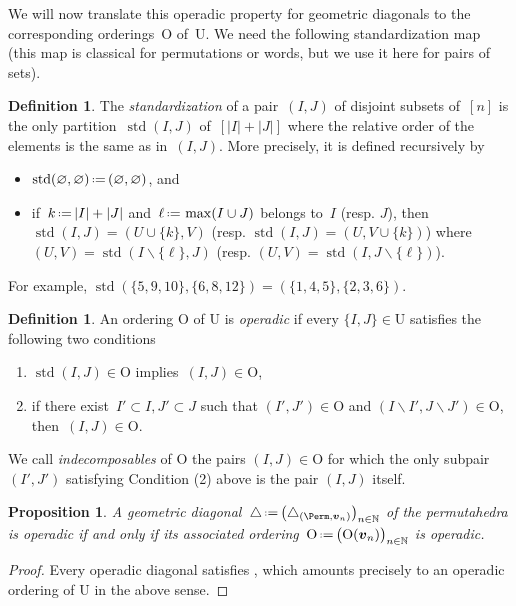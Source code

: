 \documentclass{amsart}
\newcommand{\darkblue}{\color{darkblue}} %
\newtheorem{proposition}[theorem]{Proposition}
\theoremstyle{definition}
\newtheorem{definition}[theorem]{Definition}
\newcommand{\N}{\mathbb{N}} %
\renewcommand{\b}[1]{{\boldsymbol{#1}}} %
\newcommand{\Un}{\mathrm{U}} %
\newcommand{\Or}{\mathrm{O}} %
\newcommand{\ssm}{\smallsetminus} %
\newcommand{\eqdef}{\mbox{\,\raisebox{0.2ex}{\scriptsize\ensuremath{\mathrm:}}\ensuremath{=}\,}} %
\DeclareMathOperator{\std}{std}
\newcommand{\defn}[1]{\textsl{\darkblue #1}} %
\renewcommand{\b}[1]{\boldsymbol{#1}} %
\begin{document}
We will now translate this operadic property for geometric diagonals to the corresponding orderings~$\Or$ of~$\Un$.
We need the following standardization map (this map is classical for permutations or words, but we use it here for pairs of sets).

\begin{definition}
The \defn{standardization} of a pair~$(I,J)$ of disjoint subsets of~$[n]$ is the only partition~$\std(I,J)$ of~$[|I|+|J|]$ where the relative order of the elements is the same as in~$(I,J)$.
More precisely, it is defined recursively by
\begin{itemize}
\item $\std(\varnothing, \varnothing) \eqdef (\varnothing, \varnothing)$, and
\item if~$k \eqdef |I|+|J|$ and~$\ell \eqdef \max(I \cup J)$ belongs to~$I$ (resp. $J$), then~$\std(I,J) = (U \cup \{k\}, V)$ (resp. $\std(I,J) \! = \! (U, V \cup \{k\})$) where~$(U,V) \! = \! \std(I \ssm \{\ell\}, J)$ (resp. ${(U,V) \! = \! \std(I, J \ssm \{\ell\})}$).
\end{itemize}
\end{definition}

For example, $\std(\{5,9,10\},\{6,8,12\}) = (\{1,4,5\},\{2,3,6\})$.

\begin{definition}
\label{def:operadicOrdering}
An ordering $\Or$ of $\Un$ is \defn{operadic} if every $\{I,J\} \in \Un$ satisfies the following two conditions
\begin{enumerate}
\item $\std(I,J) \in \Or$ implies~$(I,J) \in \Or$,
\item if there exist~$I'\subset I, J'\subset J$ such that $(I',J') \in \Or$ and $(I\ssm I',J\ssm J') \in \Or$, then~$(I,J) \in \Or$.
\end{enumerate}
We call \defn{indecomposables} of $\Or$ the pairs $(I,J) \in \Or$ for which the only subpair $(I',J')$ satisfying Condition (2) above is the pair $(I,J)$ itself.
\end{definition}

\begin{proposition}
\label{prop:equiv-operadic}
A geometric diagonal~$\triangle \eqdef \bigl( \triangle_{(\Perm, \b{v}_n)} \bigr)_{n \in \N}$ of the permutahedra is operadic if and only if its associated ordering~$\Or \eqdef \bigl( \Or(\b{v}_n) \bigr)_{n \in \N}$ is operadic. 
\end{proposition}

\begin{proof}
Every operadic diagonal satisfies \cite[Prop.~4.14]{LaplanteAnfossi}, which amounts precisely to an operadic ordering of $\Un$ in the above sense. 
\end{proof}
\end{document}

